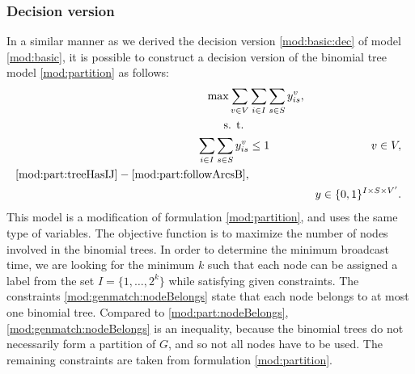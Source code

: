 \subsubsection{Decision version}

In a similar manner as we derived the decision version \eqref{mod:basic:dec} of model \eqref{mod:basic}, it is possible to construct a decision version of the binomial tree model \eqref{mod:partition} as follows:
\begin{subequations}\label{mod:genmatch}
\begin{align}
\notag \max\sum\limits_{v\in V}&\sum\limits_{i\in I}\sum\limits_{s\in S}   y_{is}^v,\\
\notag \text{s. t. } \\
\label{mod:genmatch:nodeBelongs} \sum\limits_{i\in I}\sum\limits_{s\in S}y^v_{is} & \leq 1 & v\in V,\\
\notag\eqref{mod:part:treeHasIJ} - \eqref{mod:part:followArcsB},\\
\label{mod:genmatch:dim}&&y \in \{0,1\}^{I\times S\times V'}.
\end{align}~
\end{subequations}
This model is a modification of formulation \eqref{mod:partition}, and uses the same type of variables.
The objective function is to maximize the number of nodes involved in the binomial trees.
In order to determine the minimum broadcast time, we are looking for the minimum $k$ such that each node can be assigned a label from the set $I=\{1,\dots,2^k\}$ while satisfying given constraints.
The constraints \eqref{mod:genmatch:nodeBelongs} state that each node belongs to at most one binomial tree.
Compared to \eqref{mod:part:nodeBelongs}, \eqref{mod:genmatch:nodeBelongs} is an inequality, because the binomial trees do not necessarily form a partition of $G$, and so not all nodes have to be used.
The remaining constraints are taken from formulation \eqref{mod:partition}. 

